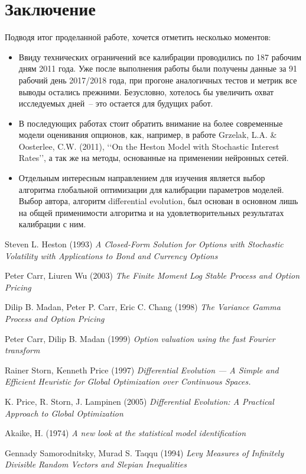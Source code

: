 \documentclass[oneside, final, 12pt]{article}
\begin{document}
\section{Заключение}
Подводя итог проделанной работе, хочется отметить несколько моментов:
\begin{itemize}
\item Ввиду технических ограничений все калибрации проводились по 187 рабочим дням 2011 года. Уже после выполнения работы были получены данные за 91 рабочий день 2017/2018 года, при прогоне аналогичных тестов и метрик все выводы остались прежними. Безусловно, хотелось бы увеличить охват исследуемых дней~-- это остается для будущих работ.
\item В последующих работах стоит обратить внимание на более современные модели оценивания опционов, как, например, в работе Grzelak, L.A. \& Oosterlee, C.W. (2011), \lq\lq{}On the Heston Model with Stochastic Interest Rates\rq\rq{}, а так же на методы, основанные на применении нейронных сетей.
\item Отдельным интересным направлением для изучения является выбор алгоритма глобальной оптимизации для калибрации параметров моделей. Выбор автора, алгоритм differential evolution\cite{DE:paper1}, был основан в основном лишь на общей применимости алгоритма и на удовлетворительных результатах калибрации с ним.
\end{itemize}



\newpage
\begin{thebibliography}{00}
 Steven L. Heston (1993)
\emph{A Closed-Form Solution for Options with Stochastic Volatility with Applications to Bond and Currency Options}

 Peter Carr, Liuren Wu (2003)
\emph{The Finite Moment Log Stable Process and Option Pricing}

 Dilip B. Madan, Peter P. Carr, Eric C. Chang (1998)
\emph{The Variance Gamma Process and Option Pricing}

 Peter Carr, Dilip B. Madan (1999)
\emph{Option valuation using the fast Fourier transform}

 Rainer Storn, Kenneth Price (1997)
\emph{Differential Evolution — A Simple and Efficient Heuristic for Global Optimization over Continuous Spaces.}

 K. Price, R. Storn, J. Lampinen (2005)
\emph{Differential Evolution: A Practical Approach to Global Optimization}

 Akaike, H. (1974)
\emph{A new look at the statistical model identification}

 Gennady Samorodnitsky, Murad S. Taqqu (1994)
\emph{Levy Measures of Infinitely Divisible Random Vectors and Slepian Inequalities}

\end{thebibliography}
\end{document}
